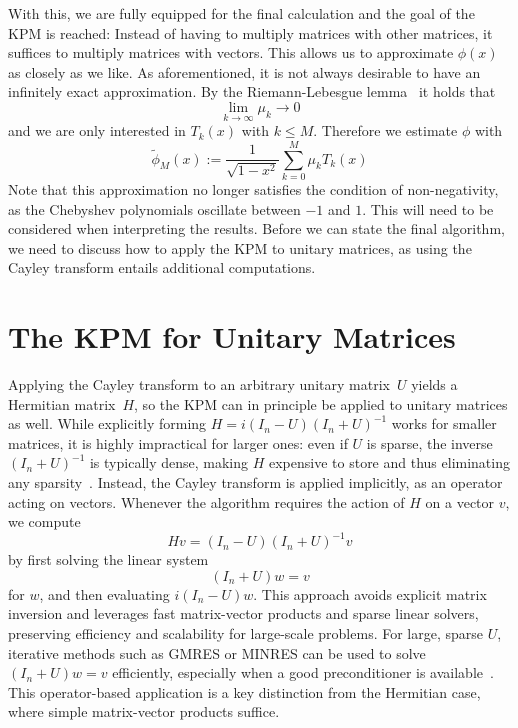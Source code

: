 With this, we are fully equipped for the final calculation and the goal of the KPM is reached:
Instead of having to multiply matrices with other matrices, it suffices to multiply matrices with vectors.
This allows us to approximate $\phi(x)$ as closely as we like.
As aforementioned, it is not always desirable to have an infinitely exact approximation.
By the Riemann-Lebesgue lemma~\cite[p.~103]{rudin1987} it holds that
\[
\lim \limits_{k \to \infty} \mu_k \to 0
\]
and we are only interested in $T_k(x)$ with $k \leq M$.
Therefore we estimate $\phi$ with
\begin{equation} \label{Approximated spectral density}
    \tilde{\phi}_M(x) := \frac{1}{\sqrt{1 - x^2}} \sum_{k = 0}^{M} \mu_k T_k(x)
\end{equation}
Note that this approximation no longer satisfies the condition of non-negativity, as the Chebyshev polynomials oscillate between $-1$ and $1$. This will need to be considered when interpreting the results. Before we can state the final algorithm, we need to discuss how to apply the KPM to unitary matrices, as using the Cayley transform entails additional computations.

\section{The KPM for Unitary Matrices}
Applying the Cayley transform to an arbitrary unitary matrix~$U$ yields a Hermitian matrix~$H$, so the KPM can in principle be applied to unitary matrices as well. While explicitly forming $H = i(I_n - U)(I_n + U)^{-1}$ works for smaller matrices, it is highly impractical for larger ones: even if $U$ is sparse, the inverse $(I_n + U)^{-1}$ is typically dense, making $H$ expensive to store and thus eliminating any sparsity~\cite{trefethen1997}. Instead, the Cayley transform is applied implicitly, as an operator acting on vectors. Whenever the algorithm requires the action of $H$ on a vector $v$, we compute
\[
    H v = (I_n - U)(I_n + U)^{-1} v
\]
by first solving the linear system
\begin{equation}\label{eq:linear_system}
    (I_n + U) w = v
\end{equation}
for $w$, and then evaluating $i(I_n - U)w$. This approach avoids explicit matrix inversion and leverages fast matrix-vector products and sparse linear solvers, preserving efficiency and scalability for large-scale problems. For large, sparse $U$, iterative methods such as GMRES or MINRES can be used to solve $(I_n + U)w = v$ efficiently, especially when a good preconditioner is available~\cite{saad2003}. This operator-based application is a key distinction from the Hermitian case, where simple matrix-vector products suffice.

